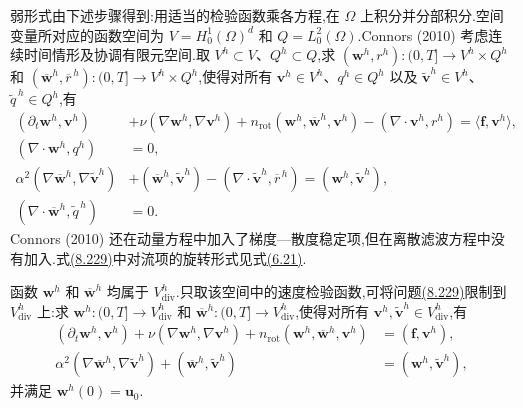 \begin{note}[有限元问题]
弱形式由下述步骤得到:用适当的检验函数乘各方程,在 $\Omega$ 上积分并分部积分.空间变量所对应的函数空间为 $V=H_0^1(\Omega)^d$ 和 $Q=L_0^2(\Omega)$.Connors (2010) 考虑连续时间情形及协调有限元空间.取 $V^h\subset V$、$Q^h\subset Q$,求
$(\bm{w}^h,r^h):(0,T]\to V^h\times Q^h$ 和
$(\overline{\bm{w}}^h,\overline r^{\,h}):(0,T]\to V^h\times Q^h$,使得对所有 $\bm{v}^h\in V^h$、$q^h\in Q^h$ 以及 $\widetilde{\bm{v}}^h\in V^h$、$\widetilde q^{\,h}\in Q^h$,有
\begin{equation}\label{eq:navier-stokes-alpha-fem-mixed}
\begin{aligned}
 (\partial_t\bm{w}^h,\bm{v}^h)
 &+\nu(\nabla\bm{w}^h,\nabla\bm{v}^h)
  +n_{\mathrm{rot}}(\bm{w}^h,\overline{\bm{w}}^h,\bm{v}^h)
  -(\nabla\cdot\bm{v}^h,r^h)
  =\langle\bm{f},\bm{v}^h\rangle,\\
 (\nabla\cdot\bm{w}^h,q^h)&=0,\\[2pt]
 \alpha^2(\nabla\overline{\bm{w}}^h,
               \nabla\widetilde{\bm{v}}^h)
 &+(\overline{\bm{w}}^h,\widetilde{\bm{v}}^h)
  -(\nabla\cdot\widetilde{\bm{v}}^h,\overline r^{\,h})
  =(\bm{w}^h,\widetilde{\bm{v}}^h),\\
 (\nabla\cdot\overline{\bm{w}}^h,\widetilde q^{\,h})&=0.
\end{aligned}
\end{equation}
Connors (2010) 还在动量方程中加入了梯度—散度稳定项,但在离散滤波方程中没有加入.式\hyperref[eq:navier-stokes-alpha-fem-mixed]{(8.229)}中对流项的旋转形式见式\hyperref[eq:steady-ns-nrot-definition]{(6.21)}.

函数 $\bm{w}^h$ 和 $\overline{\bm{w}}^h$ 均属于 $V_{\mathrm{div}}^h$.只取该空间中的速度检验函数,可将问题\hyperref[eq:navier-stokes-alpha-fem-mixed]{(8.229)}限制到 $V_{\mathrm{div}}^h$ 上:求
$\bm{w}^h:(0,T]\to V_{\mathrm{div}}^h$ 和
$\overline{\bm{w}}^h:(0,T]\to V_{\mathrm{div}}^h$,使得对所有
$\bm{v}^h,\widetilde{\bm{v}}^h\in V_{\mathrm{div}}^h$,有
\begin{equation}\label{eq:navier-stokes-alpha-fem-velocity-only}
\begin{aligned}
 (\partial_t\bm{w}^h,\bm{v}^h)
  +\nu(\nabla\bm{w}^h,\nabla\bm{v}^h)
  +n_{\mathrm{rot}}(\bm{w}^h,\overline{\bm{w}}^h,\bm{v}^h)
  &=(\bm{f},\bm{v}^h),\\
 \alpha^2(\nabla\overline{\bm{w}}^h,
              \nabla\widetilde{\bm{v}}^h)
  +(\overline{\bm{w}}^h,\widetilde{\bm{v}}^h)
  &=(\bm{w}^h,\widetilde{\bm{v}}^h),
\end{aligned}
\end{equation}
并满足 $\bm{w}^h(0)=\bm{u}_0$.
\end{note}

